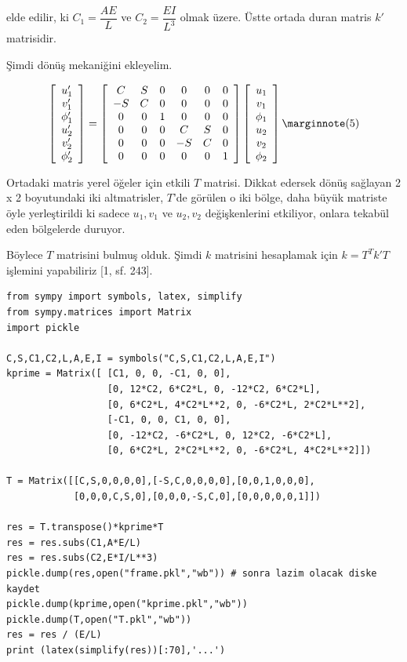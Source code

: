 \documentclass[12pt,fleqn]{article}\usepackage{../../common}
\begin{document}
elde edilir, ki $C_1 = \dfrac{AE}{L}$ ve $C_2 = \dfrac{EI}{L^3}$
olmak üzere. Üstte ortada duran matris $k'$ matrisidir.

Şimdi dönüş mekaniğini ekleyelim.

$$
\left[\begin{array}{ccc}
u'_1 \\ v'_1 \\ \phi'_1 \\ u'_2 \\ v'_2 \\ \phi'_2 
\end{array}\right] =
\left[\begin{array}{cccccc}
C & S & 0 & 0 & 0 & 0 \\
-S & C & 0 & 0 & 0 & 0 \\
0 & 0 & 1 & 0 & 0 & 0 \\
0 & 0 & 0 & C & S & 0 \\
0 & 0 & 0 & -S & C & 0 \\
0 & 0 & 0 & 0 & 0 & 1
\end{array}\right]
\left[\begin{array}{ccc}
u_1 \\ v_1 \\ \phi_1 \\ u_2 \\ v_2 \\ \phi_2 
\end{array}\right]
\mlabel{5}
$$

Ortadaki matris yerel öğeler için etkili $T$ matrisi. Dikkat edersek dönüş
sağlayan 2 x 2 boyutundaki iki altmatrisler, $T$'de görülen o iki bölge, daha
büyük matriste öyle yerleştirildi ki sadece $u_1,v_1$ ve $u_2,v_2$
değişkenlerini etkiliyor, onlara tekabül eden bölgelerde duruyor.

Böylece $T$ matrisini bulmuş olduk. Şimdi $k$ matrisini hesaplamak için
$k = T^T k' T$ işlemini yapabiliriz [1, sf. 243].

\begin{verbatim}
from sympy import symbols, latex, simplify
from sympy.matrices import Matrix
import pickle

C,S,C1,C2,L,A,E,I = symbols("C,S,C1,C2,L,A,E,I")
kprime = Matrix([ [C1, 0, 0, -C1, 0, 0],
                  [0, 12*C2, 6*C2*L, 0, -12*C2, 6*C2*L],
                  [0, 6*C2*L, 4*C2*L**2, 0, -6*C2*L, 2*C2*L**2],
                  [-C1, 0, 0, C1, 0, 0],
                  [0, -12*C2, -6*C2*L, 0, 12*C2, -6*C2*L],
                  [0, 6*C2*L, 2*C2*L**2, 0, -6*C2*L, 4*C2*L**2]])

T = Matrix([[C,S,0,0,0,0],[-S,C,0,0,0,0],[0,0,1,0,0,0],
            [0,0,0,C,S,0],[0,0,0,-S,C,0],[0,0,0,0,0,1]])

res = T.transpose()*kprime*T
res = res.subs(C1,A*E/L) 
res = res.subs(C2,E*I/L**3)
pickle.dump(res,open("frame.pkl","wb")) # sonra lazim olacak diske kaydet
pickle.dump(kprime,open("kprime.pkl","wb"))
pickle.dump(T,open("T.pkl","wb"))
res = res / (E/L) 
print (latex(simplify(res))[:70],'...')
\end{verbatim}
\end{document}
